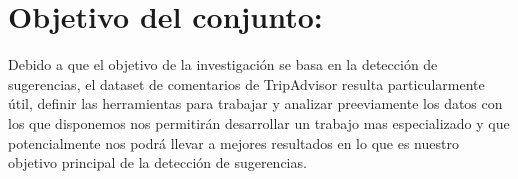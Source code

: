 \section{\textbf{Objetivo del conjunto:}}

Debido a que el objetivo de la investigación se basa en la detección de sugerencias, el dataset de comentarios de TripAdvisor resulta particularmente útil, definir las herramientas para trabajar y analizar preeviamente los datos con los que disponemos nos permitirán desarrollar un trabajo mas especializado y que potencialmente nos podrá llevar a mejores resultados en lo que es nuestro objetivo principal de la detección de sugerencias.




